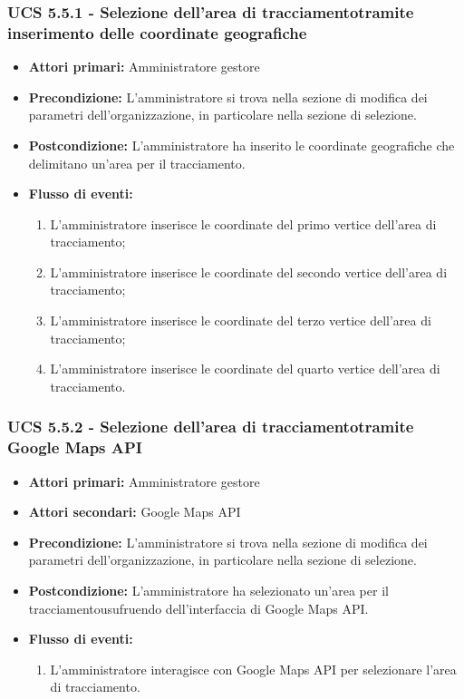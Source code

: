 \subsubsection{UCS 5.5.1 - Selezione dell'area di tracciamentotramite inserimento delle coordinate geografiche}%
\begin{itemize}
\item \textbf{Attori primari:} Amministratore gestore
\item \textbf{Precondizione:} L'amministratore si trova nella sezione di modifica dei parametri dell'organizzazione, in particolare nella sezione di selezione.
\item \textbf{Postcondizione:} L'amministratore ha inserito le coordinate geografiche che delimitano un'area per il tracciamento.
\item \textbf{Flusso di eventi:}
\begin{enumerate}
    \item L'amministratore inserisce le coordinate del primo vertice dell'area di tracciamento;
    \item L'amministratore inserisce le coordinate del secondo vertice dell'area di tracciamento;
    \item L'amministratore inserisce le coordinate del terzo vertice dell'area di tracciamento;
    \item L'amministratore inserisce le coordinate del quarto vertice dell'area di tracciamento.
\end{enumerate}
\end{itemize}

\subsubsection{UCS 5.5.2 - Selezione dell'area di tracciamentotramite Google Maps API}%
\begin{itemize}
\item \textbf{Attori primari:} Amministratore gestore
\item \textbf{Attori secondari:} Google Maps API
\item \textbf{Precondizione:} L'amministratore si trova nella sezione di modifica dei parametri dell'organizzazione, in particolare nella sezione di selezione.
\item \textbf{Postcondizione:} L'amministratore ha selezionato un'area per il tracciamentousufruendo dell'interfaccia di Google Maps API.
\item \textbf{Flusso di eventi:}
\begin{enumerate}
    \item L'amministratore interagisce con Google Maps API per selezionare l'area di tracciamento.
\end{enumerate}
\end{itemize}

